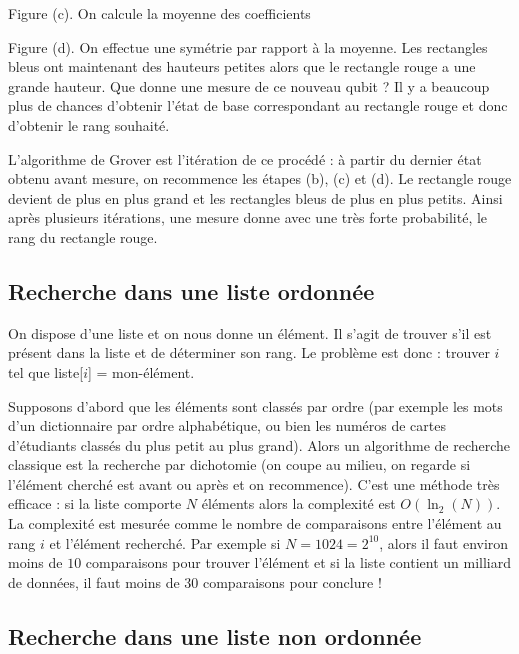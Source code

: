 \documentclass[11pt,class=report,crop=false]{standalone}
\begin{document}
\smallskip

Figure (c). On calcule la moyenne des coefficients

\smallskip

Figure (d). On effectue une symétrie par rapport à la moyenne. Les rectangles bleus ont maintenant des hauteurs petites alors que le rectangle rouge a une grande hauteur. Que donne une mesure de ce nouveau qubit ? Il y a beaucoup plus de chances d'obtenir l'état de base correspondant au rectangle rouge et donc d'obtenir le rang souhaité.

\smallskip

L'algorithme de Grover est l'itération de ce procédé : à partir du dernier état obtenu avant mesure, on recommence les étapes (b), (c) et (d). Le rectangle rouge devient de plus en plus grand et les rectangles bleus de plus en plus petits. Ainsi après plusieurs itérations, une mesure donne avec une très forte probabilité, le rang du rectangle rouge.


\subsection{Recherche dans une liste ordonnée}

On dispose d'une liste et on nous donne un élément. Il s'agit de trouver s'il est présent dans la liste et de déterminer son rang. Le problème est donc : trouver $i$ tel que liste[$i$] = mon-élément.

Supposons d'abord que les éléments sont classés par ordre (par exemple les mots d'un dictionnaire par ordre alphabétique, ou bien les numéros de cartes d'étudiants classés du plus petit au plus grand). 
Alors un algorithme de recherche classique est la recherche par dichotomie (on coupe au milieu, on regarde si l'élément cherché est avant ou après et on recommence). C'est une méthode très efficace : si la liste comporte $N$ éléments alors la complexité est
$O( \ln_2(N) )$. La complexité est mesurée comme le nombre de comparaisons entre l'élément au rang $i$ et l'élément recherché.
Par exemple si $N=1024=2^{10}$, alors il faut environ moins de $10$ comparaisons pour trouver l'élément et si la liste contient un milliard de données, il faut moins de $30$ comparaisons pour conclure !



\subsection{Recherche dans une liste non ordonnée}
\end{document}
